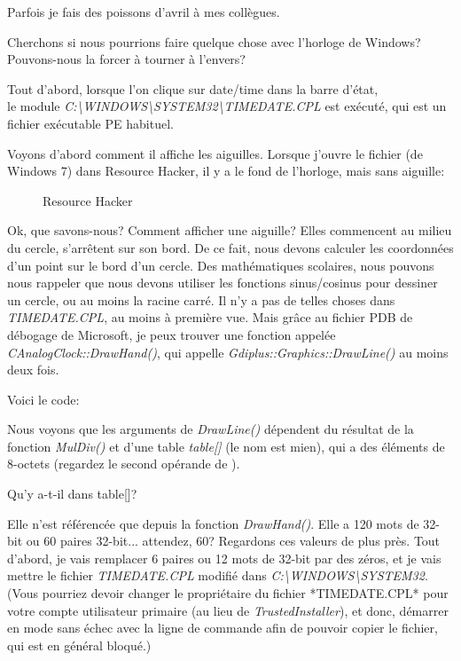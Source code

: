 
Parfois je fais des poissons d'avril à mes collègues.

Cherchons si nous pourrions faire quelque chose avec l'horloge de Windows?
Pouvons-nous la forcer à tourner à l'envers?

Tout d'abord, lorsque l'on clique sur date/time dans la barre d'état,\\
le module \emph{C:\textbackslash{}WINDOWS\textbackslash{}SYSTEM32\textbackslash{}TIMEDATE.CPL}
est exécuté, qui est un fichier exécutable \ac{PE} habituel.

Voyons d'abord comment il affiche les aiguilles.
Lorsque j'ouvre le fichier (de Windows 7) dans Resource Hacker, il y a le fond de
l'horloge, mais sans aiguille:

\begin{figure}[H]
\centering
{}
\caption{Resource Hacker}
\end{figure}

Ok, que savons-nous? Comment afficher une aiguille? Elles commencent au milieu du
cercle, s'arrêtent sur son bord.
De ce fait, nous devons calculer les coordonnées d'un point sur le bord d'un cercle.
Des mathématiques scolaires, nous pouvons nous rappeler que nous devons utiliser
les fonctions sinus/cosinus pour dessiner un cercle, ou au moins la racine carré.
Il n'y a pas de telles choses dans \emph{TIMEDATE.CPL}, au moins à première vue.
Mais grâce au fichier PDB de débogage de Microsoft, je peux trouver une fonction
appelée \emph{CAnalogClock::DrawHand()}, qui appelle \emph{Gdiplus::Graphics::DrawLine()}
au moins deux fois.

Voici le code:



Nous voyons que les arguments de \emph{DrawLine()} dépendent du résultat de la fonction
\emph{MulDiv()} et d'une table \emph{table[]} (le nom est mien), qui a des éléments
de 8-octets (regardez le second opérande de ).

Qu'y a-t-il dans table[]?



Elle n'est référencée que depuis la fonction \emph{DrawHand()}.
Elle a 120 mots de 32-bit ou 60 paires 32-bit... attendez, 60?
Regardons ces valeurs de plus près.
Tout d'abord, je vais remplacer 6 paires ou 12 mots de 32-bit par des zéros, et je
vais mettre le fichier \emph{TIMEDATE.CPL} modifié dans \emph{C:\textbackslash{}WINDOWS\textbackslash{}SYSTEM32}.
(Vous pourriez devoir changer le propriétaire du fichier *TIMEDATE.CPL* pour votre
compte utilisateur primaire (au lieu de \emph{TrustedInstaller}), et donc, démarrer
en mode sans échec avec la ligne de commande afin de pouvoir copier le fichier, qui
est en général bloqué.)

